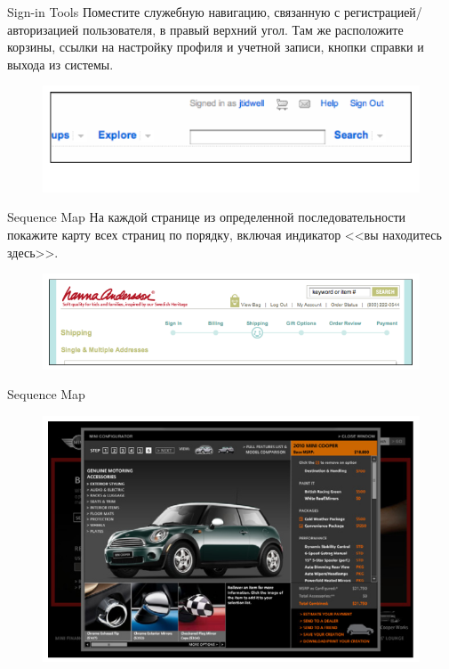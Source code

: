 \documentclass{beamer}
\begin{document}
\begin{frame}[t]{Sign-in Tools}
	Поместите служебную навигацию, связанную с регистрацией/авторизацией пользователя, в правый верхний угол. Там же расположите корзины, ссылки на настройку профиля и учетной записи, кнопки справки и выхода из системы.
	\begin{figure}[h]
		\centering
		\includegraphics[scale=0.5]{images/lec07-pic42.png}
	\end{figure}
\end{frame}	

\begin{frame}[t]{Sequence Map}
	На каждой странице из определенной последовательности покажите карту всех страниц по порядку, включая индикатор <<вы находитесь здесь>>.
	\begin{figure}[h]
		\centering
		\includegraphics[scale=0.5]{images/lec07-pic43.png}
	\end{figure}
\end{frame}	

\begin{frame}[t]{Sequence Map}
	\begin{figure}[h]
		\centering
		\includegraphics[scale=0.5]{images/lec07-pic44.png}
	\end{figure}
\end{frame}	
\end{document}
